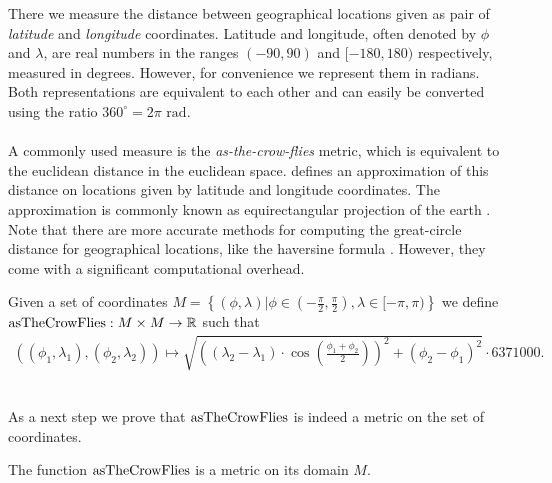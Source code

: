 	There we measure the distance between geographical locations given as pair of \textit{latitude} and \textit{longitude} coordinates.
	Latitude and longitude, often denoted by $\phi$ and $\lambda$, are real numbers in the ranges $(-90, 90)$ and $[-180, 180)$ respectively,
	measured in degrees. However, for convenience we represent them in radians. Both representations are equivalent to each other
	and can easily be converted using the ratio $360^\circ = 2 \pi \text{ rad}$.\\\\
	A commonly used measure is the \textit{as-the-crow-flies} metric, which is equivalent to the euclidean distance in the euclidean space.
	 defines an approximation of this distance on locations given by latitude and longitude coordinates.
	The approximation is commonly known as equirectangular projection of the earth .
	Note that there are more accurate methods for computing the great-circle distance for geographical locations,
	like the haversine formula . However, they come with a significant computational overhead.
	\begin{mydef}\label{asTheCrowFlies}
		Given a set of coordinates $M = \left\{(\phi, \lambda) | \phi \in \left(-\frac{\pi}{2}, \frac{\pi}{2}\right), \lambda \in [-\pi, \pi)\right\}$ we define
		$\operatorname{asTheCrowFlies}: M \times M \to \mathbb{R}$ such that
		\begin{align*}
			\left(\left(\phi_1, \lambda_1\right), \left(\phi_2, \lambda_2\right)\right) \mapsto
				\sqrt{\left(\left(\lambda_2 - \lambda_1\right) \cdot \cos\left(\frac{\phi_1 + \phi_2}{2}\right)\right)^2
					+ \left(\phi_2 - \phi_1\right)^2} \cdot 6371000.
		\end{align*}
	\end{mydef}\quad\\
	As a next step we prove that $\operatorname{asTheCrowFlies}$ is indeed a metric on the set of coordinates.
	\begin{myproposition}
		The function $\operatorname{asTheCrowFlies}$ is a metric on its domain $M$.
	\end{myproposition}
